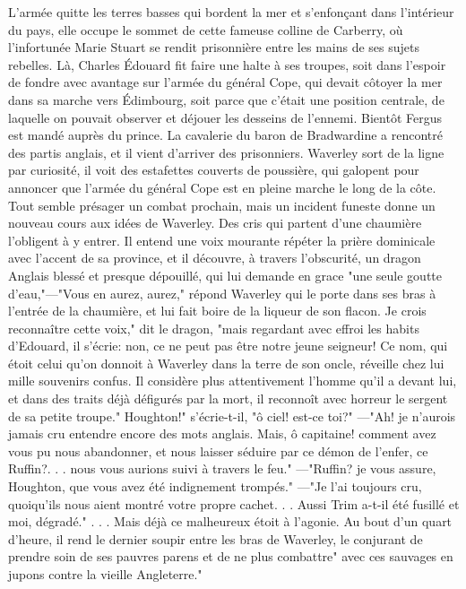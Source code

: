 {L'armée quitte les terres basses qui bordent\setcounter{page}{236} la mer et s'enfonçant dans l'intérieur du pays, elle occupe le sommet de cette fameuse colline de Carberry, où l'infortunée Marie Stuart se rendit prisonnière entre les mains de ses sujets rebelles. Là, Charles Édouard fit faire une halte à ses troupes, soit dans l'espoir de fondre avec avantage sur l'armée du général Cope, qui devait côtoyer la mer dans sa marche vers Édimbourg, soit parce que c'était une position centrale, de laquelle on pouvait observer et déjouer les desseins de l'ennemi. Bientôt Fergus est mandé auprès du prince. La cavalerie du baron de Bradwardine a rencontré des partis anglais, et il vient d'arriver des prisonniers. Waverley sort de la ligne par curiosité, il voit des estafettes couverts de poussière, qui galopent pour annoncer que l'armée du général Cope est en pleine marche le long de la côte. Tout semble présager un combat prochain, mais un incident funeste donne un nouveau cours aux idées de Waverley. Des cris qui partent d'une chaumière l'obligent à y entrer. Il entend une voix mourante répéter la prière dominicale avec l'accent de sa province, et il découvre, à travers l'obscurité, un dragon Anglais blessé et presque dépouillé, qui lui demande en grace "une seule goutte d'eau,"—"Vous en aurez,\setcounter{page}{237} aurez," répond Waverley qui le porte dans ses bras à l’entrée de la chaumière, et lui fait boire de la liqueur de son flacon. Je crois reconnaître cette voix," dit le dragon, "mais regardant avec effroi les habits d’Edouard, il s’écrie: non, ce ne peut pas être notre jeune seigneur!
Ce nom, qui étoit celui qu’on donnoit à Waverley dans la terre de son oncle, réveille chez lui mille souvenirs confus. Il considère plus attentivement l’homme qu’il a devant lui, et dans des traits déjà défigurés par la mort, il reconnoît avec horreur le sergent de sa petite troupe." Houghton!" s’écrie-t-il, "ô ciel! est-ce toi?" —"Ah! je n’aurois jamais cru entendre encore des mots anglais. Mais, ô capitaine! comment avez vous pu nous abandonner, et nous laisser séduire par ce démon de l’enfer, ce Ruffin?. . . nous vous aurions suivi à travers le feu." —"Ruffin? je vous assure, Houghton, que vous avez été indignement trompés." —"Je l’ai toujours cru, quoiqu’ils nous aient montré votre propre cachet. . . Aussi Trim a-t-il été fusillé et moi, dégradé." . . . Mais déjà ce malheureux étoit à l’agonie. Au bout d’un quart d’heure, il rend le dernier soupir entre les bras de Waverley, le conjurant de prendre\setcounter{page}{238} soin de ses pauvres parens et de ne plus combattre" avec ces sauvages en jupons contre la vieille Angleterre."
}
